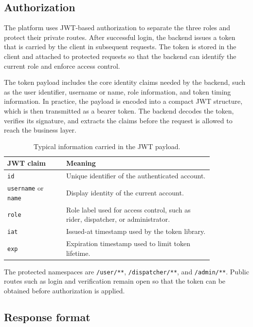 \documentclass[12pt,a4paper]{article}
\begin{document}
\subsection{Authorization}

The platform uses JWT-based authorization to separate the three roles and protect their private routes. After successful login, the backend issues a token that is carried by the client in subsequent requests. The token is stored in the client and attached to protected requests so that the backend can identify the current role and enforce access control.

The token payload includes the core identity claims needed by the backend, such as the user identifier, username or name, role information, and token timing information. In practice, the payload is encoded into a compact JWT structure, which is then transmitted as a bearer token. The backend decodes the token, verifies its signature, and extracts the claims before the request is allowed to reach the business layer.

\begin{table}[H]
\centering
\begin{tabular}{p{0.24\linewidth} p{0.60\linewidth}}
\toprule
\textbf{JWT claim} & \textbf{Meaning} \\
\midrule
\texttt{id} & Unique identifier of the authenticated account. \\
\texttt{username} or \texttt{name} & Display identity of the current account. \\
\texttt{role} & Role label used for access control, such as rider, dispatcher, or administrator. \\
\texttt{iat} & Issued-at timestamp used by the token library. \\
\texttt{exp} & Expiration timestamp used to limit token lifetime. \\
\bottomrule
\end{tabular}
\caption{Typical information carried in the JWT payload.}
\end{table}

The protected namespaces are \texttt{/user/**}, \texttt{/dispatcher/**}, and \texttt{/admin/**}. Public routes such as login and verification remain open so that the token can be obtained before authorization is applied.

\subsection{Response format}
\end{document}

